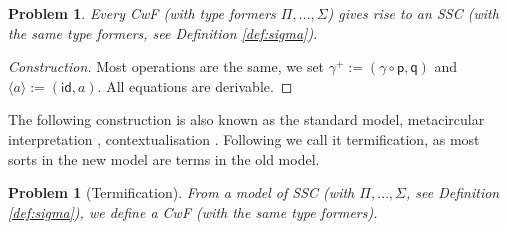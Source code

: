 \documentclass[a4paper,UKenglish]{article}
\newtheorem{problem}[theorem]{Problem}
\newcommand{\p}{\mathsf{p}}
\newcommand{\q}{\mathsf{q}}
\newcommand{\id}{\mathsf{id}}
\begin{document}
\begin{problem}
  Every CwF (with type formers $\Pi, \dots, \Sigma$) gives rise to an SSC (with
  the same type formers, see Definition \ref{def:sigma}).
\end{problem}
\begin{proof}[Construction]
  Most operations are the same, we set $\gamma^+ :=
  (\gamma\circ\p,\q)$ and $\langle a\rangle := (\id,a)$. All equations are derivable.
\end{proof}
The following construction is also known as the standard model,
metacircular interpretation \cite{DBLP:conf/popl/AltenkirchK16},
contextualisation \cite{DBLP:conf/fscd/BocquetKS23}. Following
\cite{kaposi-shallow} we call it termification, as most sorts in the
new model are terms in the old model.
\begin{problem}[Termification]\label{prob:termification}
  From a model of SSC (with $\Pi, \dots, \Sigma$, see Definition
  \ref{def:sigma}), we define a CwF (with the same type formers).
\end{problem}
\end{document}
